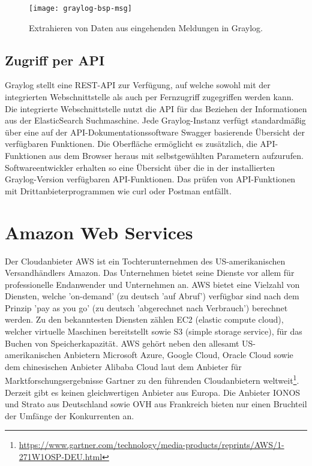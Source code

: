 \begin{figure}[h!]
\centering
\texttt{[image: graylog-bsp-msg]}
\caption{Extrahieren von Daten aus eingehenden Meldungen in Graylog.}
\end{figure}

\subsection{Zugriff per API}

Graylog stellt eine REST-API zur Verfügung, auf welche sowohl mit der integrierten Webschnittstelle als auch per Fernzugriff zugegriffen werden kann. Die integrierte Webschnittstelle nutzt die API für das Beziehen der Informationen aus der ElasticSearch Suchmaschine. Jede Graylog-Instanz verfügt standardmäßig über eine auf der API-Dokumentationssoftware Swagger basierende Übersicht der verfügbaren Funktionen. Die Oberfläche ermöglicht es zusätzlich, die API-Funktionen aus dem Browser heraus mit selbstgewählten Parametern aufzurufen. Softwareentwickler erhalten so eine Übersicht über die in der installierten Graylog-Version verfügbaren API-Funktionen. Das prüfen von API-Funktionen mit Drittanbieterprogrammen wie curl oder Postman entfällt.

\section{Amazon Web Services}

Der Cloudanbieter AWS ist ein Tochterunternehmen des US-amerikanischen Versandhändlers Amazon. Das Unternehmen bietet seine Dienste vor allem für professionelle Endanwender und Unternehmen an. AWS bietet eine Vielzahl von Diensten, welche 'on-demand' (zu deutsch 'auf Abruf') verfügbar sind nach dem Prinzip 'pay as you go' (zu deutsch 'abgerechnet nach Verbrauch') berechnet werden. Zu den bekanntesten Diensten zählen EC2 (elastic compute cloud), welcher virtuelle Maschinen bereitstellt sowie S3 (simple storage service), für das Buchen von Speicherkapazität. AWS gehört neben den allesamt US-amerikanischen Anbietern Microsoft Azure, Google Cloud, Oracle Cloud sowie dem chinesischen Anbieter Alibaba Cloud laut dem Anbieter für Marktforschungsergebnisse Gartner zu den führenden Cloudanbietern weltweit\footnote{\url{https://www.gartner.com/technology/media-products/reprints/AWS/1-271W1OSP-DEU.html}}. Derzeit gibt es keinen gleichwertigen Anbieter aus Europa. Die Anbieter IONOS und Strato aus Deutschland sowie OVH aus Frankreich bieten nur einen Bruchteil der Umfänge der Konkurrenten an.

